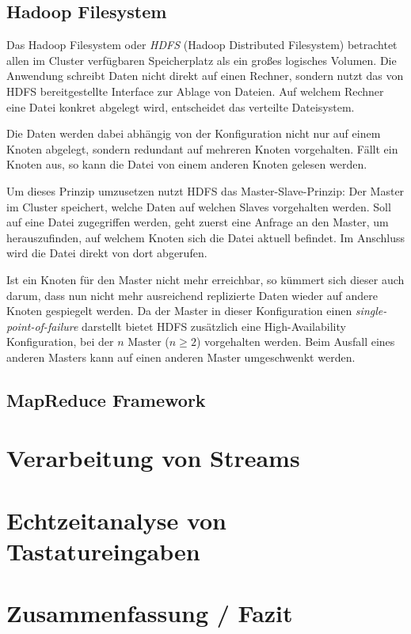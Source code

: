 \documentclass[a4paper,11pt]{scrartcl}
\begin{document}
\subsection{Hadoop Filesystem}

Das Hadoop Filesystem oder \textit{HDFS} (Hadoop Distributed Filesystem)
betrachtet allen im Cluster verfügbaren Speicherplatz als ein großes logisches
Volumen. Die Anwendung schreibt Daten nicht direkt auf einen Rechner, sondern
nutzt das von HDFS bereitgestellte Interface zur Ablage von Dateien. Auf
welchem Rechner eine Datei konkret abgelegt wird, entscheidet das verteilte
Dateisystem.

Die Daten werden dabei abhängig von der Konfiguration nicht nur auf einem
Knoten abgelegt, sondern redundant auf mehreren Knoten vorgehalten. Fällt ein
Knoten aus, so kann die Datei von einem anderen Knoten gelesen werden.


Um dieses Prinzip umzusetzen nutzt HDFS das Master-Slave-Prinzip: Der Master im
Cluster speichert, welche Daten auf welchen Slaves vorgehalten werden. Soll auf
eine Datei zugegriffen werden, geht zuerst eine Anfrage an den Master, um
herauszufinden, auf welchem Knoten sich die Datei aktuell befindet. Im
Anschluss wird die Datei direkt von dort abgerufen.

Ist ein Knoten für den Master nicht mehr erreichbar, so kümmert sich dieser
auch darum, dass nun nicht mehr ausreichend replizierte Daten wieder auf andere
Knoten gespiegelt werden. Da der Master in dieser Konfiguration einen
\textit{single-point-of-failure} darstellt bietet HDFS zusätzlich eine
High-Availability Konfiguration, bei der $n$ Master ($n \geq 2$) vorgehalten
werden. Beim Ausfall eines anderen Masters kann auf einen anderen Master
umgeschwenkt werden.


\subsection{MapReduce Framework}

\section{Verarbeitung von Streams}

\section{Echtzeitanalyse von Tastatureingaben}

\section{Zusammenfassung / Fazit}
\end{document}
